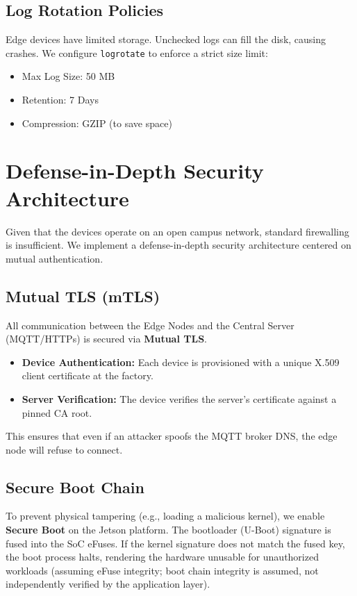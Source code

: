 \documentclass[conference]{IEEEtran}
\begin{document}
\subsection{Log Rotation Policies}
Edge devices have limited storage. Unchecked logs can fill the disk, causing crashes. We configure \texttt{logrotate} to enforce a strict size limit:
\begin{itemize}
    \item Max Log Size: 50 MB
    \item Retention: 7 Days
    \item Compression: GZIP (to save space)
\end{itemize}

\section{Defense-in-Depth Security Architecture}
Given that the devices operate on an open campus network, standard firewalling is insufficient. We implement a defense-in-depth security architecture centered on mutual authentication.

\subsection{Mutual TLS (mTLS)}
All communication between the Edge Nodes and the Central Server (MQTT/HTTPs) is secured via \textbf{Mutual TLS}. 
\begin{itemize}
    \item \textbf{Device Authentication:} Each device is provisioned with a unique X.509 client certificate at the factory.
    \item \textbf{Server Verification:} The device verifies the server's certificate against a pinned CA root.
\end{itemize}
This ensures that even if an attacker spoofs the MQTT broker DNS, the edge node will refuse to connect.

\subsection{Secure Boot Chain}
To prevent physical tampering (e.g., loading a malicious kernel), we enable \textbf{Secure Boot} on the Jetson platform. The bootloader (U-Boot) signature is fused into the SoC eFuses. If the kernel signature does not match the fused key, the boot process halts, rendering the hardware unusable for unauthorized workloads (assuming eFuse integrity; boot chain integrity is assumed, not independently verified by the application layer).
\end{document}
